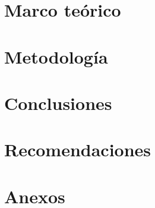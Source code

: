 \documentclass[11pt, letterpaper, twoside, openright]{report}
\newcommand{\defaultparformat}[1]{
	{\setlength{\parskip}{2ex}
     }
}
\begin{document}
\ifdefined\CAPmarcoteorico
	\newpage
	\chapter{Marco teórico}
	\ifdefined\parpordefecto
		\defaultparformat{i-marco_teorico}
	\else
		
	\fi
\fi

\ifdefined\CAPmetodologia
	\newpage
	\chapter{Metodología}
	\ifdefined\parpordefecto
		\defaultparformat{j-metodologia}
	\else
		
	\fi
\fi

\newpage
\ifdefined\parpordefecto
	\defaultparformat{j-capitulos}
\else
	
\fi

\ifdefined\CAPconclusiones
	\newpage
	\chapter{Conclusiones}
	\ifdefined\parpordefecto
		\defaultparformat{k-conclusiones}
	\else
		
	\fi
\fi

\ifdefined\CAPrecomendaciones
	\newpage
	\chapter{Recomendaciones}
	\ifdefined\parpordefecto
		\defaultparformat{l-recomendaciones}
	\else
		
	\fi
\fi

\ifdefined\CAPbibliografia
	\newpage
    \cleardoublepage{}
	\chapter{\bibname}
    \printbibliography[heading=none]
\fi

\ifdefined\CAPanexos
	\newpage
	\chapter{Anexos}
	\ifdefined\parpordefecto
		\defaultparformat{n-anexos}
	\else
		
	\fi
\fi

\ifdefined\CAPglosario
	\newpage
	\printglossary
\fi
\end{document}
